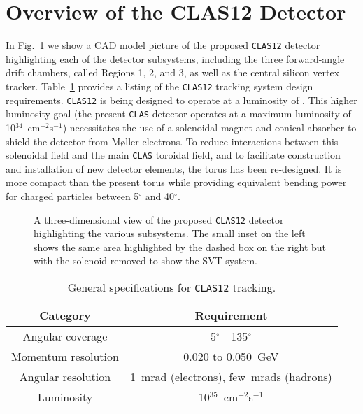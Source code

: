\section{Overview of the CLAS12 Detector}

In Fig.~\ref{clas12} we show a CAD model picture of the proposed 
{\tt CLAS12} detector highlighting each of the detector subsystems, 
including the three forward-angle drift chambers, called Regions 1, 2, 
and 3, as well as the central silicon vertex tracker.  
Table~\ref{tracker-specs} provides a listing of the {\tt CLAS12} tracking 
system design requirements.  {\tt CLAS12} is being designed to operate at 
a luminosity of .  This higher luminosity goal (the present {\tt CLAS} 
detector operates at a maximum luminosity of 10$^{34}$~cm$^{-2}$s$^{-1}$) 
necessitates the use of a solenoidal magnet and conical absorber to shield 
the detector from M{\o}ller electrons.  To reduce interactions between this 
solenoidal field and the main {\tt CLAS} toroidal field, and to facilitate 
construction and installation of new detector elements, the torus has been 
re-designed.  It is more compact than the present torus while providing 
equivalent bending power for charged particles between 5$^{\circ}$ and 
40$^{\circ}$.

\vfil
\eject

\begin{figure}[htbp]
\vspace{11.0cm}
\caption{\small{A three-dimensional view of the proposed {\tt CLAS12} 
detector highlighting the various subsystems.  The small inset on the left
shows the same area highlighted by the dashed box on the right but with
the solenoid removed to show the SVT system.}}
\label{clas12}
\end{figure}

\begin{table}[htbp]
\begin{center}
\begin{tabular} {||c|c||} \hline \hline
{\bf Category}      & {\bf Requirement} \\ \hline
Angular coverage    & 5$^{\circ}$ - 135$^{\circ}$ \\ \hline
Momentum resolution & 0.020 to 0.050~GeV          \\ \hline
Angular resolution  & 1~mrad (electrons), few~mrads (hadrons) \\ \hline
Luminosity     &  10$^{35}$~cm$^{-2}$s$^{-1}$ \\ \hline
\end{tabular}
\caption{\small{General specifications for {\tt CLAS12} tracking.}}
\label{tracker-specs}
\end{center}
\end{table}

